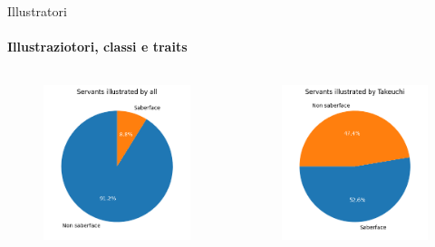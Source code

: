 \documentclass{beamer}
\begin{document}
\begin{darkframes}
  \begin{frame}{Illustratori}
    \framesubtitle{Illustraziotori, classi e traits}
    \begin{columns}
      \begin{column}{0.50\textwidth}
        \begin{figure}
          \centering
          \includegraphics[scale=0.55]{./images/saberface.png}
        \end{figure}
      \end{column}
      \begin{column}{0.50\textwidth}
        \begin{figure}
          \centering
          \includegraphics[scale=0.55]{./images/saberface_take.png}
        \end{figure}
      \end{column}
    \end{columns}
  \end{frame}


\end{darkframes}
\end{document}

